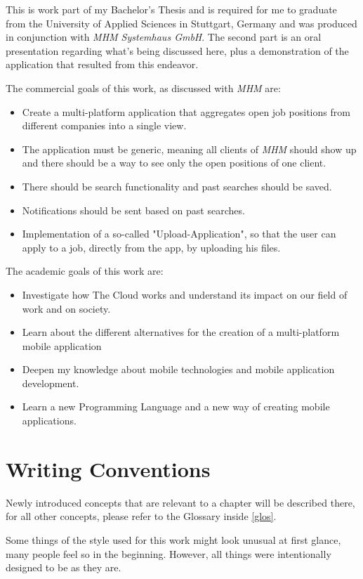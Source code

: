 This is work part of my Bachelor's Thesis and is required for me to graduate from the University of Applied Sciences in Stuttgart, Germany and was produced in conjunction with \textit{MHM Systemhaus GmbH}. The second part is an oral presentation regarding what's being discussed here, plus a demonstration of the application that resulted from this endeavor.

The commercial goals of this work, as discussed with \textit{MHM} are:
\begin{itemize}
\item Create a multi-platform application that aggregates open job positions from different companies into a single view.
\item The application must be generic, meaning all clients of \textit{MHM} should show up and there should be a way to see only the open positions of one client.
\item There should be search functionality and past searches should be saved.
\item Notifications should be sent based on past searches.
\item Implementation of a so-called "Upload-Application", so that the user can apply to a job, directly from the app, by uploading his files.
\end{itemize}

The academic goals of this work are:
\begin{itemize}
\item Investigate how The Cloud works and understand its impact on our field of work and on society.
\item Learn about the different alternatives for the creation of a multi-platform mobile application
\item Deepen my knowledge about mobile technologies and mobile application development.
\item Learn a new Programming Language and a new way of creating mobile applications.
\end{itemize}


\section{Writing Conventions}
Newly introduced concepts that are relevant to a chapter will be described there, for all other concepts, please refer to the Glossary inside \autoref{glos}.

 Some things of the style used for this work might look unusual at first glance, many people feel so in the beginning.
However, all things were intentionally designed to be as they are.










   

